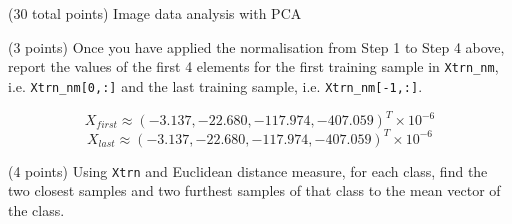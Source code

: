 \documentclass[12pt]{article}
\begin{document}
\clearpage
%
%

\begin{question}{(30 total points) Image data analysis with PCA}

  
  

  
  \medskip

  \begin{subquestion}{(3 points)
      Once you have applied the normalisation from Step 1 to Step 4 above,
      report the values of the first 4 elements for the first training
      sample in \texttt{Xtrn\_nm},
      i.e. \texttt{Xtrn\_nm[0,:]} and the last training sample,
      i.e. \texttt{Xtrn\_nm[-1,:]}.
    } \label{Q1.1}
    

      \begin{answerbox}{10em}
      	$$X_{first} \approx (-3.137, -22.680, -117.974, -407.059)^T \times 10^{-6}$$
      	$$X_{last} \approx (-3.137, -22.680, -117.974, -407.059)^T \times 10^{-6}$$
      	      	
      \end{answerbox}
  


   \end{subquestion}
   \begin{subquestion}{(4 points)
      Using {\tt Xtrn} and Euclidean distance
      measure, for each class,
      find the two closest samples and two furthest
      samples of that class to the mean vector of the class.
    }  \label{Q1.2}





\end{subquestion}
\end{question}
\end{document}

